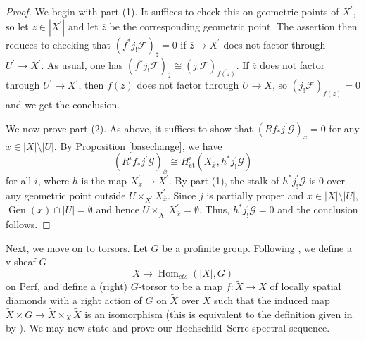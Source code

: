 \documentclass{amsart}
\theoremstyle{remark}
\numberwithin{equation}{subsection}
\newcommand{\cF}{{\mathcal F}}
\newcommand{\cG}{{\mathcal G}}
\DeclareMathOperator{\Gen}{Gen}
\DeclareMathOperator{\Hom}{Hom}
\newcommand{\et}{\mathrm{\acute{e}t}}
\newcommand{\Perf}{\mathrm{Perf}}
\newcommand{\ol}{\overline}
\newcommand{\ul}{\underline}
\renewcommand{\(}{\left(}
\renewcommand{\)}{\right)}
\begin{document}
\begin{proof}
We begin with part (1). It suffices to check this on geometric points of $X^{\prime}$, so let $z\in |X^{\prime}|$ and let $\ol{z}$ be the corresponding geometric point. The assertion then reduces to checking that $(f^{\ast}j_{!}\cF)_{\ol{z}}=0$ if $\ol{z} \to X^{\prime}$ does not factor through $U^{\prime} \to X^{\prime}$. As usual, one has $(f^{\ast}j_{!}\cF)_{\ol{z}} \cong (j_{!}\cF)_{\ol{f(z)}}$.
If $\ol{z}$ does not factor through $U^{\prime} \to X^{\prime}$, then $\ol{f(z)}$ does not factor through $U \to X$, so $(j_{!}\cF)_{\ol{f(z)}}=0$ and we get the conclusion.

\medskip
We now prove part (2). As above, it suffices to show that $(Rf_{\ast}j^{\prime}_{!}\cG)_{\ol{x}}=0$ for any $x\in |X|\setminus |U|$. By Proposition \ref{basechange}, we have
$$ (R^{i}f_{\ast}j^{\prime}_{!}\cG)_{\ol{x}} \cong H^{i}_{\et}(X^{\prime}_{\ol{x}},h^{\ast}j^{\prime}_{!}\cG) $$
for all $i$, where $h$ is the map $X^{\prime}_{\ol{x}} \to X^{\prime}$. By part (1), the stalk of $h^{\ast}j^{\prime}_{!}\cG$ is $0$ over any geometric point outside $U\times_{X^{\prime}}X^{\prime}_{\ol{x}}$. Since $j$ is partially proper and $x\in |X|\setminus |U|$, $\Gen(x) \cap |U| = \emptyset $ and hence $U\times_{X^{\prime}}X^{\prime}_{\ol{x}} =\emptyset$. Thus, $h^{\ast}j^{\prime}_{!}\cG=0$ and the conclusion follows.
\end{proof}

\medskip

Next, we move on to torsors. Let $G$ be a profinite group. Following \cite[Definition 10.12]{diamonds}, we define a v-sheaf $\ul{G}$
$$ X \mapsto \Hom_{cts}(|X|,G) $$
on $\Perf$, and define a (right) $G$-torsor to be a map $f \colon \widetilde{X} \to X$ of locally spatial diamonds with a right action of $\ul{G}$ on $\widetilde{X}$ over $X$ such that the induced map $\widetilde{X}\times \ul{G} \to \widetilde{X} \times_{X}\widetilde{X}$ is an isomorphism (this is equivalent to the definition given in \cite[Definition 10.12]{diamonds} by \cite[Lemma 10.13]{diamonds}). We may now state and prove our Hochschild--Serre spectral sequence.
\end{document}
